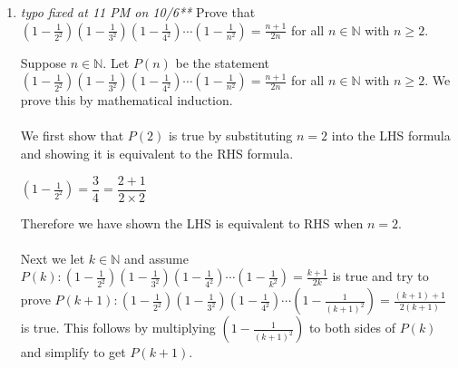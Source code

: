 \documentclass{article}
\newcommand{\D}{\displaystyle}
\begin{document}
\begin{enumerate}
\item {\it typo fixed at 11 PM on 10/6**} Prove that $\D \left(1-\frac{1}{2^2} \right) \left(1-\frac{1}{3^2} \right)  \left(1-\frac{1}{4^2} \right)  \cdots  \left(1-\frac{1}{n^2} \right) = \frac{n+1}{2n}$ for all $n \in \mathbb{N}$ with $n \geq 2$. 
\medskip
\vspace{.15in}

 Suppose $n \in \mathbb{N}$. Let $P(n)$ be the statement $\D \left(1-\frac{1}{2^2} \right) \left(1-\frac{1}{3^2} \right)  \left(1-\frac{1}{4^2} \right)  \cdots  \left(1-\frac{1}{n^2} \right) = \frac{n+1}{2n}$ for all $n \in \mathbb{N}$ with $n \geq 2$. We prove this by mathematical induction.\\\\
We first show that $P(2)$ is true by substituting $n = 2$ into the LHS formula and showing it is equivalent to the RHS formula.

\begin{center}
	$\D \left(1-\frac{1}{2^2} \right) = \dfrac{3}{4} = \dfrac{2+1}{2 \times 2}$
\end{center}  
Therefore we have shown the LHS is equivalent to RHS when $n = 2$.\\\\
Next we let $k \in \mathbb{N}$ and assume $P(k):\D \left(1-\frac{1}{2^2} \right) \left(1-\frac{1}{3^2} \right)  \left(1-\frac{1}{4^2} \right)  \cdots  \left(1-\frac{1}{k^2} \right) = \frac{k+1}{2k}$ is true and try to prove $P(k+1):\D \left(1-\frac{1}{2^2} \right) \left(1-\frac{1}{3^2} \right)  \left(1-\frac{1}{4^2} \right)  \cdots  \left(1-\frac{1}{(k+1)^2} \right) = \frac{(k+1)+1}{2(k+1)}$ is true. This follows by multiplying $\D \left(1-\frac{1}{(k+1)^2} \right)$ to both sides of $P(k)$ and simplify to get $P(k+1)$.


\end{enumerate}
\end{document}
